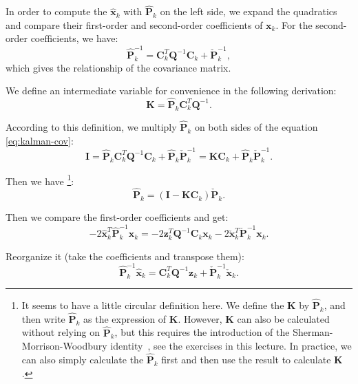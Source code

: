 In order to compute the $\hat{\mathbf{x}}_k$ with $\mathbf{\hat{P}}_k$ on the left side, we expand the quadratics and compare their first-order and second-order coefficients of $\mathbf{x}_k$. For the second-order coefficients, we have:
\begin{equation}
	\label{eq:kalman-cov}
	\hat{\mathbf{P}}_k^{ - 1} = \mathbf{C}_k^T{\mathbf{Q}^{ - 1}}{\mathbf{C}_k} + \check {\mathbf{P}}_k^{ - 1},
\end{equation}
which gives the relationship of the covariance matrix.

We define an intermediate variable for convenience in the following derivation:
\begin{equation}
	\label{eq:kalman-K}
	\mathbf{K} = \mathbf{\hat{P}}_k \mathbf{C}_k^T \mathbf{Q}^{-1}.
\end{equation}

According to this definition, we multiply $\mathbf{\hat{P}}_k$ on both sides of the equation \eqref{eq:kalman-cov}: 
\begin{equation}
	\mathbf{I} = \mathbf{\hat{P}}_k \mathbf{C}_k^T \mathbf{Q}^{-1} \mathbf{C}_k + \mathbf{\hat{P}}_k \mathbf{\check{P}}_k^{-1} = \mathbf{K} \mathbf{C}_k + \mathbf{\hat{P}}_k \mathbf{\check{P}}_k^{-1}.
\end{equation}

Then we have \footnote{It seems to have a little circular definition here. We define the $\mathbf{K}$ by $\mathbf{\hat{P}}_k$, and then write $\mathbf{\hat{P}}_k$ as the expression of $\mathbf{K}$. However, $\mathbf{K}$ can also be calculated without relying on $\mathbf{\hat{P}}_k$, but this requires the introduction of the Sherman-Morrison-Woodbury identity~\cite{Sherman1950}, see the exercises in this lecture. In practice, we can also simply calculate the $\mathbf{\hat{P}}_k$ first and then use the result to calculate $\mathbf{K}$. }:
\begin{equation}
	\mathbf{\hat{P}}_k = ( \mathbf{I} - \mathbf{K} \mathbf{C}_k ) \mathbf{\check{P}}_k.
\end{equation}

Then we compare the first-order coefficients and get: 
\begin{equation}
	- 2\hat {\mathbf{x}}_k^T \hat{\mathbf{P}}_k^{ - 1}{\mathbf{x}_k} =  - 2\mathbf{z}_k^T {\mathbf{Q}^{ - 1}}{\mathbf{C}_k}{\mathbf{x}_k} - 2\mathbf{\check {x}}_k^T \mathbf{\check {P}}_k^{ - 1}{\mathbf{x}_k}.
\end{equation}

Reorganize it (take the coefficients and transpose them):
\begin{equation}
	\hat { \mathbf{P}}_k^{ - 1}{{\hat{\mathbf{x}}}_k} = \mathbf{C}_k^T {\mathbf{Q}^{ - 1}}{\mathbf{z}_k} + \check{\mathbf{P}}_k^{ - 1}{{\mathbf{\check{x}}}_k}.
\end{equation}


